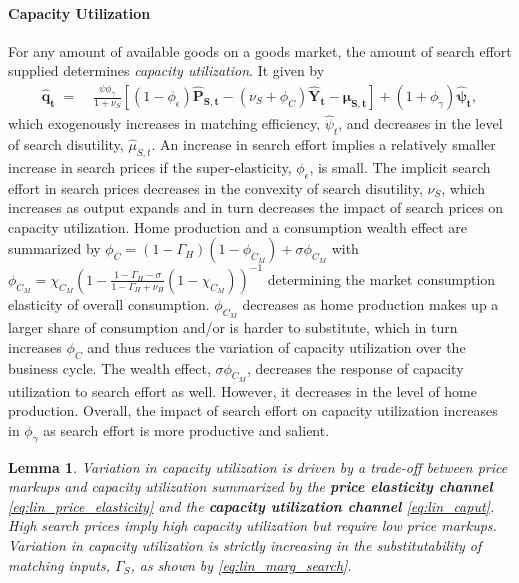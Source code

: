 \documentclass[12pt,3p,authoryear,review]{elsarticle}
\newtheorem{lemma}{Lemma}
\begin{document}
\paragraph{Capacity Utilization}%
For any amount of available goods on a goods market, the amount of search effort supplied determines \emph{capacity utilization}. It given by%
\begin{align}\label{eq:lin_caput}%
	\boldsymbol{\hat{q}_t} \; = & \; \frac{\psi \phi_\gamma}{1+\nu_S} \left[ \left(1-\phi_\epsilon\right) \boldsymbol{\hat{P}_{S,t}} - \left(\nu_S+\phi_{C}\right) \boldsymbol{\hat{Y}_t} - \boldsymbol{\hat{\mu}_{S,t}} \right] + \left(1+\phi_\gamma\right) \boldsymbol{\hat{\psi}_t},%
\end{align}%
which exogenously increases in matching efficiency, $\hat{\psi}_t$, and decreases in the level of search disutility, $\hat{\mu}_{S,t}$. An increase in search effort implies a relatively smaller increase in search prices if the super-elasticity, $\phi_\epsilon$, is small. The implicit search effort in search prices decreases in the convexity of search disutility, $\nu_S$, which increases as output expands and in turn decreases the impact of search prices on capacity utilization. Home production and a consumption wealth effect are summarized by $\phi_C = \left(1-\Gamma_H\right)\left(1-\phi_{C_M}\right) + \sigma \phi_{C_M}$ with $\phi_{C_M} = \chi_{C_M} \left(1-\frac{1-\Gamma_H-\sigma}{1-\Gamma_H+\nu_H}\left(1-\chi_{C_M}\right)\right)^{-1}$ determining the market consumption elasticity of overall consumption. $\phi_{C_M}$ decreases as home production makes up a larger share of consumption and/or is harder to substitute, which in turn increases $\phi_C$ and thus reduces the variation of capacity utilization over the business cycle. The wealth effect, $\sigma\phi_{C_M}$, decreases the response of capacity utilization to search effort as well. However, it decreases in the level of home production. Overall, the impact of search effort on capacity utilization increases in $\phi_\gamma$ as search effort is more productive and salient.%
\begin{lemma}\label{lem:caput}%
	Variation in capacity utilization is driven by a trade-off between price markups and capacity utilization summarized by the \textbf{price elasticity channel} \eqref{eq:lin_price_elasticity} and the \textbf{capacity utilization channel} \eqref{eq:lin_caput}. High search prices imply high capacity utilization but require low price markups. Variation in capacity utilization is strictly increasing in the substitutability of matching inputs, $\Gamma_S$, as shown by \eqref{eq:lin_marg_search}.%
\end{lemma}%
\end{document}
